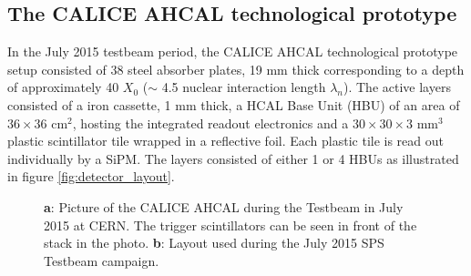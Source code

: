 \documentclass[twoside,a4paper,11pt]{article}
\begin{document}
\subsection{The CALICE AHCAL technological prototype}

In the July 2015 testbeam period, the CALICE AHCAL technological prototype setup consisted of 38 steel absorber plates, 19 mm thick corresponding to a depth of approximately 40 $X_0$ ($\sim$ 4.5 nuclear interaction length $\lambda_{n}$). The active layers consisted of a iron cassette, 1 mm thick, a HCAL Base Unit (HBU) of an area of $36\times36$ cm$^2$, hosting the integrated readout electronics and a $30\times30\times3$ mm$^3$ plastic scintillator tile wrapped in a reflective foil. Each plastic tile is read out individually by a SiPM. The layers consisted of either 1 or 4 HBUs as illustrated in figure \ref{fig:detector_layout}. 

\begin{figure}[htbp]
	\hfill
	\caption[]{\textbf{a}: Picture of the CALICE AHCAL during the Testbeam in July 2015 at CERN. The trigger scintillators can be seen in front of the stack in the photo. \textbf{b}: Layout used during the July 2015 SPS Testbeam campaign.}
	\label{fig:full_detector_layout}
\end{figure}
\end{document}
